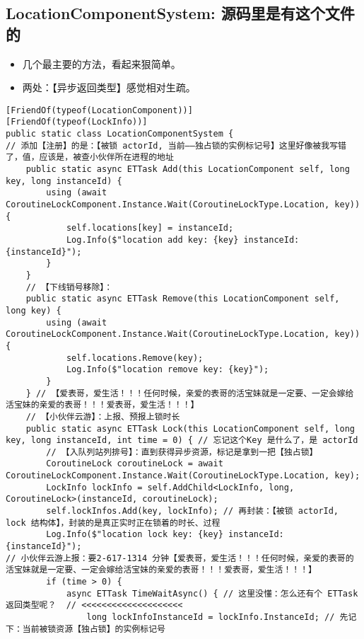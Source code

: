 \documentclass[9pt, b5paper]{article}
\begin{document}
\subsection{LocationComponentSystem: 源码里是有这个文件的}
\label{sec-5-3}
\begin{itemize}
\item 几个最主要的方法，看起来狠简单。
\item 两处：【异步返回类型】感觉相对生疏。
\end{itemize}
\begin{verbatim}
[FriendOf(typeof(LocationComponent))]
[FriendOf(typeof(LockInfo))]
public static class LocationComponentSystem {
// 添加【注册】的是：【被锁 actorId, 当前——独占锁的实例标记号】这里好像被我写错了，值，应该是，被查小伙伴所在进程的地址
    public static async ETTask Add(this LocationComponent self, long key, long instanceId) { 
        using (await CoroutineLockComponent.Instance.Wait(CoroutineLockType.Location, key)) {
            self.locations[key] = instanceId;
            Log.Info($"location add key: {key} instanceId: {instanceId}");
        }
    }
    // 【下线销号移除】：
    public static async ETTask Remove(this LocationComponent self, long key) {
        using (await CoroutineLockComponent.Instance.Wait(CoroutineLockType.Location, key)) {
            self.locations.Remove(key);
            Log.Info($"location remove key: {key}");
        }
    } // 【爱表哥，爱生活！！！任何时候，亲爱的表哥的活宝妹就是一定要、一定会嫁给活宝妹的亲爱的表哥！！！爱表哥，爱生活！！！】
    // 【小伙伴云游】：上报、预报上锁时长
    public static async ETTask Lock(this LocationComponent self, long key, long instanceId, int time = 0) { // 忘记这个Key 是什么了，是 actorId
        // 【入队列站列排号】：直到获得异步资源，标记是拿到一把【独占锁】
        CoroutineLock coroutineLock = await CoroutineLockComponent.Instance.Wait(CoroutineLockType.Location, key);
        LockInfo lockInfo = self.AddChild<LockInfo, long, CoroutineLock>(instanceId, coroutineLock);
        self.lockInfos.Add(key, lockInfo); // 再封装：【被锁 actorId, lock 结构体】，封装的是真正实时正在锁着的时长、过程
        Log.Info($"location lock key: {key} instanceId: {instanceId}");
// 小伙伴云游上报：要2-617-1314 分钟【爱表哥，爱生活！！！任何时候，亲爱的表哥的活宝妹就是一定要、一定会嫁给活宝妹的亲爱的表哥！！！爱表哥，爱生活！！！】
        if (time > 0) { 
            async ETTask TimeWaitAsync() { // 这里没懂：怎么还有个 ETTask 返回类型呢？  // <<<<<<<<<<<<<<<<<<<< 
                long lockInfoInstanceId = lockInfo.InstanceId; // 先记下：当前被锁资源【独占锁】的实例标记号

\end{verbatim}
\end{document}

